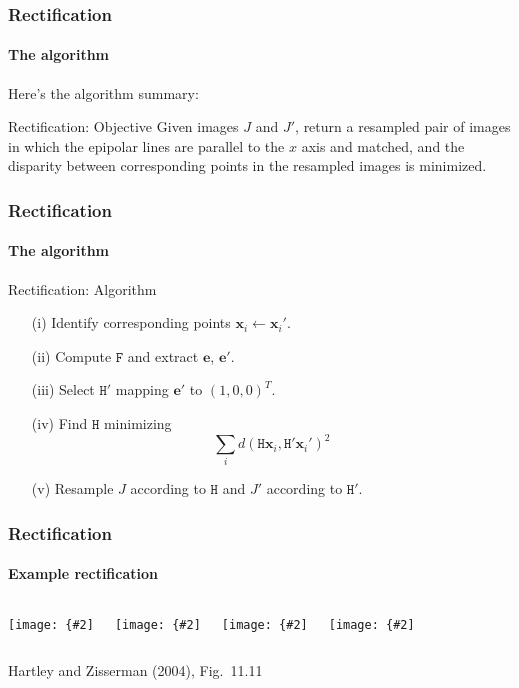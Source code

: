\documentclass[aspectratio=169]{beamer}
\renewcommand{\vec}[1]{\boldsymbol{#1}}
\newcommand{\mat}[1]{\mathtt{#1}}
\newcommand{\myfig}[3]{\centerline{\texttt{[image: \{\#2]}}}
    \centerline{\scriptsize #3}}
\begin{document}
\begin{frame}
\frametitle{Rectification}
\framesubtitle{The algorithm}

Here's the algorithm summary:
\begin{block}{Rectification: Objective}
  Given images $J$ and $J'$, return a resampled pair of images in
  which the epipolar lines are parallel to the $x$ axis and matched,
  and the disparity between corresponding points in the resampled
  images is minimized.
\end{block}

\end{frame}

\begin{frame}
\frametitle{Rectification}
\framesubtitle{The algorithm}

\begin{block}{Rectification: Algorithm}
\begin{itemize}
\item[(i)] Identify corresponding points $\vec{x}_i \leftarrow
  \vec{x}_i'$.
\item[(ii)] Compute $\mat{F}$ and extract $\vec{e}$, $\vec{e}'$.
\item[(iii)] Select $\mat{H}'$ mapping $\vec{e}'$ to $(1,0,0)^T$.
\item[(iv)] Find $\mat{H}$ minimizing
\begin{equation*}
\sum_i d(\mat{H}\vec{x}_i,\mat{H}'\vec{x}_i')^2
\end{equation*}
\item[(v)] Resample $J$ according to $\mat{H}$ and $J'$ according to
$\mat{H}'$.
\end{itemize}
\end{block}

\end{frame}

\begin{frame}
\frametitle{Rectification}
\framesubtitle{Example rectification}

\begin{columns}
\column{2in}
\myfig{1.65in}{HZ-fig10-11a}{Image $J$}

\vspace{0.05in}

\myfig{1.65in}{HZ-fig10-11c}{$J$ resampled by $\mat{H}$}

\column{2in}
\myfig{1.65in}{HZ-fig10-11b}{Image $J'$}

\vspace{0.05in}

\myfig{1.65in}{HZ-fig10-11d}{$J'$ resampled by $\mat{H}'$}
\end{columns}

\vspace{0.1in}

\centerline{\scriptsize Hartley and Zisserman (2004), Fig.\ 11.11}

\end{frame}
\end{document}
